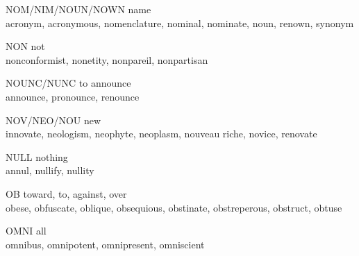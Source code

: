 \begin{flashcard}[Roots]{NOM/NIM/NOUN/NOWN}
name\\
\vspace{0.2in}
acronym, acronymous, nomenclature, nominal, nominate, noun, renown, synonym\\
\end{flashcard}

\begin{flashcard}[Roots]{NON}
not\\
\vspace{0.2in}
nonconformist, nonetity, nonpareil, nonpartisan\\
\end{flashcard}

\begin{flashcard}[Roots]{NOUNC/NUNC}
to announce\\
\vspace{0.2in}
announce, pronounce, renounce\\
\end{flashcard}

\begin{flashcard}[Roots]{NOV/NEO/NOU}
new\\
\vspace{0.2in}
innovate, neologism, neophyte, neoplasm, nouveau riche, novice, renovate\\
\end{flashcard}

\begin{flashcard}[Roots]{NULL}
nothing\\
\vspace{0.2in}
annul, nullify, nullity\\
\end{flashcard}

\begin{flashcard}[Roots]{OB}
toward, to, against, over\\
\vspace{0.2in}
obese, obfuscate, oblique, obsequious, obstinate, obstreperous, obstruct, obtuse\\
\end{flashcard}

\begin{flashcard}[Roots]{OMNI}
all\\
\vspace{0.2in}
omnibus, omnipotent, omnipresent, omniscient\\
\end{flashcard}


